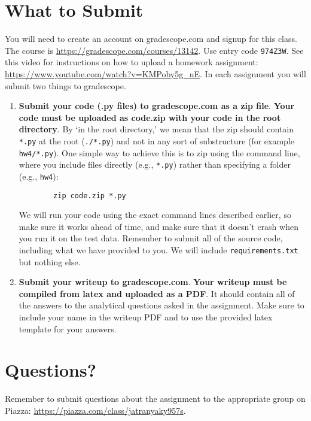 \documentclass[11pt]{article}
\begin{document}
\section{What to Submit}
	You will need to create an account on gradescope.com and signup for this class. The course is \href{https://gradescope.com/courses/13142}{\url{https://gradescope.com/courses/13142}}. Use entry code {\tt 974Z3W}. See this video for instructions on how to upload a homework assignment: \href{https://www.youtube.com/watch?v=KMPoby5g_nE}{\url{https://www.youtube.com/watch?v=KMPoby5g_nE}}. In each assignment you will submit two things to gradescope.
	\begin{enumerate}
		\item \textbf{Submit your code (.py files) to gradescope.com as a zip file}. \textbf{Your code must be uploaded as code.zip with your code in the root directory}. By `in the root directory,' we mean that the zip should contain \texttt{*.py} at the root (\texttt{./*.py}) and not in any sort of substructure (for example \texttt{hw4/*.py}). One simple way to achieve this is to zip using the command line, where you include files directly (e.g., \texttt{*.py}) rather than specifying a folder (e.g., \texttt{hw4}):
		\begin{verbatim}
		zip code.zip *.py
		\end{verbatim}
		
		We will run your code using the exact command lines described earlier, so make sure it works ahead of time, and make sure that it doesn't crash when you run it on the test data. Remember to submit all of the source code, including what we have provided to you. We will include {\tt requirements.txt} but nothing else.
		\item \textbf{Submit your writeup to gradescope.com}. \textbf{Your writeup must be compiled from latex and uploaded as a PDF}. It should contain all of the answers to the analytical questions asked in the assignment. Make sure to include your name in the writeup PDF and to use the provided latex template for your answers. 
	\end{enumerate}
	
	\section{Questions?}
	Remember to submit questions about the assignment to the appropriate group on Piazza: \href{https://piazza.com/class/jatranyaky957s}{\url{https://piazza.com/class/jatranyaky957s}}.
	
\end{document}
